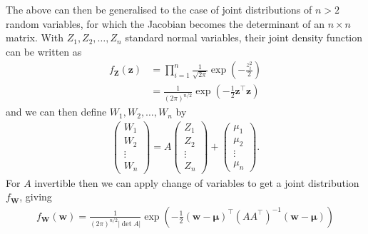 \documentclass{tikzposter} %
\begin{document}
\begin{columns}
{
\hphantom{}

The above can then be generalised to the case of joint distributions of $n > 2$ random variables, for which the Jacobian becomes the determinant of an $n \times n$ matrix. With $Z_{1}, Z_{2}, \dots, Z_{n}$ standard normal variables, their joint density function can be written as
\begin{align*}
  f_{\bm{Z}}(\bm{z}) &= \prod_{i=1}^{n} \frac{1}{\sqrt{2\pi}} \exp\left(-\frac{z_{i}^{2}}{2}\right) \\
  &= \frac{1}{(2\pi)^{n/2}} \exp\left(-\frac{1}{2}\bm{z}^{\top}\bm{z}\right)
\end{align*}
and we can then define $W_{1}, W_{2}, \dots, W_{n}$ by
\begin{align*}
  \begin{pmatrix}
    W_{1} \\ W_{2} \\ \vdots \\ W_{n}
  \end{pmatrix}
  = A \begin{pmatrix}
        Z_{1} \\ Z_{2} \\ \vdots \\ Z_{n}
      \end{pmatrix}
  + \begin{pmatrix}
      \mu_{1} \\ \mu_{2} \\ \vdots \\ \mu_{n}
    \end{pmatrix}.
\end{align*}
For $A$ invertible then we can apply change of variables to get a joint distribution $f_{\bm{W}}$, giving
\begin{align*}
f_{\bm{W}}(\bm{w}) = \frac{1}{(2\pi)^{n/2}|\det A|} \exp\left(-\frac{1}{2} (\bm{w}-\bm{\mu})^{\top}(AA^{\top})^{-1}(\bm{w}-\bm{\mu})\right)
\end{align*}
}

\end{columns}
\end{document}
